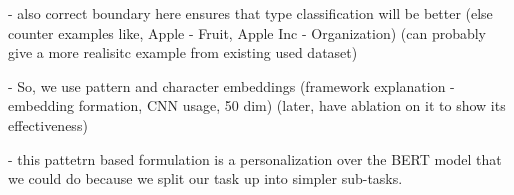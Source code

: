 - also correct boundary here ensures that type classification will be better (else counter examples like, Apple - Fruit, Apple Inc - Organization) (can probably give a more realisitc example from existing used dataset)

- So, we use pattern and character embeddings (framework explanation - embedding formation, CNN usage, 50 dim) (later, have ablation on it to show its effectiveness)

- this pattetrn based formulation is a personalization over the BERT model that we could do because we split our task up into simpler sub-tasks.

